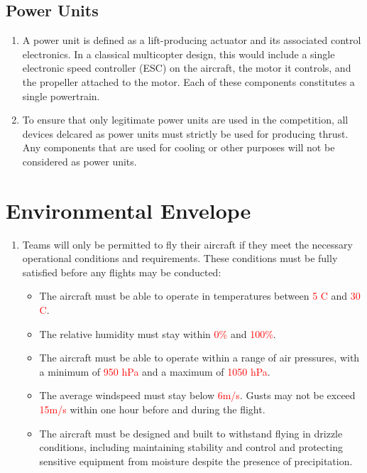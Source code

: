 \documentclass{article}
\begin{document}
\subsection{Power Units}
\begin{enumerate}
  \item A power unit is defined as a lift-producing actuator and its associated control electronics. In a classical multicopter design, this would include a single electronic speed controller (ESC) on the aircraft, the motor it controls, and the propeller attached to the motor. Each of these components constitutes a single powertrain. 
  \item To ensure that only legitimate power units are used in the competition, all devices delcared as power units must strictly be used for producing thrust. Any components that are used for cooling or other purposes will not be considered as power units.
\end{enumerate}


\newpage
\newpage

\section{Environmental Envelope}
\begin{enumerate}
  \item Teams will only be permitted to fly their aircraft if they meet the necessary operational conditions and requirements. These conditions must be fully satisfied before any flights may be conducted:
\begin {itemize}
  \item The aircraft must be able to operate in temperatures between \textcolor{red}{5 \degree C} and \textcolor{red}{30 \degree C}.
  \item The relative humidity must stay within \textcolor{red}{0\%} and \textcolor{red}{100\%}. 
  \item The aircraft must be able to operate within a range of air pressures, with a minimum of \textcolor{red}{950 hPa} and a maximum of \textcolor{red}{1050 hPa}.
  \item The average windspeed must stay below \textcolor{red}{6m/s}. Gusts may not be exceed \textcolor{red}{15m/s} within one hour before and during the flight.
  \item The aircraft must be designed and built to withstand flying in drizzle conditions, including maintaining stability and control and protecting sensitive equipment from moisture despite the presence of precipitation.
  
\end {itemize}
\end{enumerate}
\end{document}
